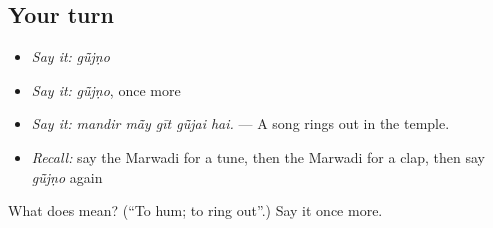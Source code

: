 \subsection*{Your turn}
\begin{itemize}
\raggedright
  \item \emph{Say it:} \emph{gū̃jṇo}
  \item \emph{Say it:} \emph{gū̃jṇo}, once more
  \item \emph{Say it:} \emph{mandir mā̃y gīt gū̃jai hai.} — A song rings out in the temple.
  \item \emph{Recall:} say the Marwadi for a tune, then the Marwadi for a clap, then say \emph{gū̃jṇo} again
\end{itemize}

\begin{tcolorbox}[breakable,colback=teal!4,colframe=teal!35!black,title={Before you move on}]
What does  mean? (\textquotedblleft{}To hum; to ring out\textquotedblright{}.) Say it once more.
\end{tcolorbox}
